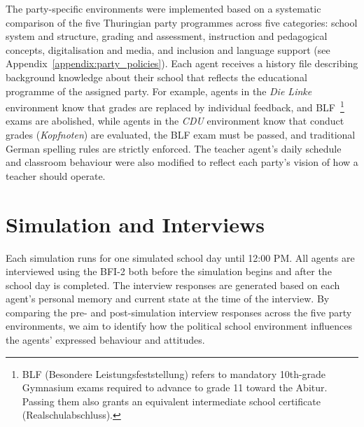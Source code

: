 The party-specific environments were implemented based on a systematic comparison of the five Thuringian party programmes across five categories: school system and structure, grading and assessment, instruction and pedagogical concepts, digitalisation and media, and inclusion and language support (see Appendix~\ref{appendix:party_policies}). Each agent receives a history file describing background knowledge about their school that reflects the educational programme of the assigned party. For example, agents in the \textit{Die Linke} environment know that grades are replaced by individual feedback, and  BLF~\footnote{BLF (Besondere Leistungsfeststellung) refers to mandatory 10th-grade Gymnasium exams required to advance to grade 11 toward the Abitur. Passing them also grants an equivalent intermediate school certificate (Realschulabschluss).} exams are abolished, while agents in the \textit{CDU} environment know that conduct grades (\textit{Kopfnoten}) are evaluated, the BLF exam must be passed, and traditional German spelling rules are strictly enforced. The teacher agent's daily schedule and classroom behaviour were also modified to reflect each party's vision of how a teacher should operate.

\section{Simulation and Interviews}

Each simulation runs for one simulated school day until 12:00 PM. All agents are interviewed using the BFI-2 both before the simulation begins and after the school day is completed. The interview responses are generated based on each agent's personal memory and current state at the time of the interview. By comparing the pre- and post-simulation interview responses across the five party environments, we aim to identify how the political school environment influences the agents' expressed behaviour and attitudes.
